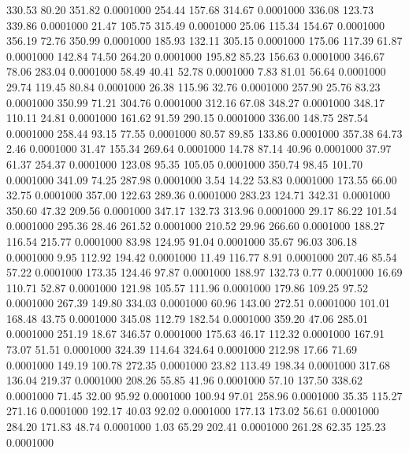  330.53   80.20  351.82   0.0001000
 254.44  157.68  314.67   0.0001000
 336.08  123.73  339.86   0.0001000
  21.47  105.75  315.49   0.0001000
  25.06  115.34  154.67   0.0001000
 356.19   72.76  350.99   0.0001000
 185.93  132.11  305.15   0.0001000
 175.06  117.39   61.87   0.0001000
 142.84   74.50  264.20   0.0001000
 195.82   85.23  156.63   0.0001000
 346.67   78.06  283.04   0.0001000
  58.49   40.41   52.78   0.0001000
   7.83   81.01   56.64   0.0001000
  29.74  119.45   80.84   0.0001000
  26.38  115.96   32.76   0.0001000
 257.90   25.76   83.23   0.0001000
 350.99   71.21  304.76   0.0001000
 312.16   67.08  348.27   0.0001000
 348.17  110.11   24.81   0.0001000
 161.62   91.59  290.15   0.0001000
 336.00  148.75  287.54   0.0001000
 258.44   93.15   77.55   0.0001000
  80.57   89.85  133.86   0.0001000
 357.38   64.73    2.46   0.0001000
  31.47  155.34  269.64   0.0001000
  14.78   87.14   40.96   0.0001000
  37.97   61.37  254.37   0.0001000
 123.08   95.35  105.05   0.0001000
 350.74   98.45  101.70   0.0001000
 341.09   74.25  287.98   0.0001000
   3.54   14.22   53.83   0.0001000
 173.55   66.00   32.75   0.0001000
 357.00  122.63  289.36   0.0001000
 283.23  124.71  342.31   0.0001000
 350.60   47.32  209.56   0.0001000
 347.17  132.73  313.96   0.0001000
  29.17   86.22  101.54   0.0001000
 295.36   28.46  261.52   0.0001000
 210.52   29.96  266.60   0.0001000
 188.27  116.54  215.77   0.0001000
  83.98  124.95   91.04   0.0001000
  35.67   96.03  306.18   0.0001000
   9.95  112.92  194.42   0.0001000
  11.49  116.77    8.91   0.0001000
 207.46   85.54   57.22   0.0001000
 173.35  124.46   97.87   0.0001000
 188.97  132.73    0.77   0.0001000
  16.69  110.71   52.87   0.0001000
 121.98  105.57  111.96   0.0001000
 179.86  109.25   97.52   0.0001000
 267.39  149.80  334.03   0.0001000
  60.96  143.00  272.51   0.0001000
 101.01  168.48   43.75   0.0001000
 345.08  112.79  182.54   0.0001000
 359.20   47.06  285.01   0.0001000
 251.19   18.67  346.57   0.0001000
 175.63   46.17  112.32   0.0001000
 167.91   73.07   51.51   0.0001000
 324.39  114.64  324.64   0.0001000
 212.98   17.66   71.69   0.0001000
 149.19  100.78  272.35   0.0001000
  23.82  113.49  198.34   0.0001000
 317.68  136.04  219.37   0.0001000
 208.26   55.85   41.96   0.0001000
  57.10  137.50  338.62   0.0001000
  71.45   32.00   95.92   0.0001000
 100.94   97.01  258.96   0.0001000
  35.35  115.27  271.16   0.0001000
 192.17   40.03   92.02   0.0001000
 177.13  173.02   56.61   0.0001000
 284.20  171.83   48.74   0.0001000
   1.03   65.29  202.41   0.0001000
 261.28   62.35  125.23   0.0001000
